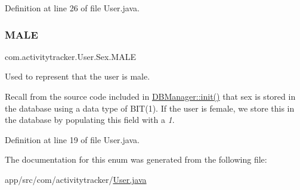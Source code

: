 Definition at line 26 of file User.\+java.

\mbox{\label{enumcom_1_1activitytracker_1_1_user_1_1_sex_ad3b626a38bd4615eb621d75b939f412d}} 
\subsubsection{\texorpdfstring{M\+A\+LE}{MALE}}
{\footnotesize\ttfamily com.\+activitytracker.\+User.\+Sex.\+M\+A\+LE}

Used to represent that the user is male.

Recall from the source code included in \mbox{\hyperlink{classcom_1_1activitytracker_1_1_d_b_manager_a41df4600bb5901a26a4ea6a7108a70b9}{D\+B\+Manager\+::init()}} that sex is stored in the database using a data type of B\+I\+T(1). If the user is female, we store this in the database by populating this field with a {\itshape 1}. 

Definition at line 19 of file User.\+java.



The documentation for this enum was generated from the following file\+:\begin{DoxyCompactItemize}
\item 
app/src/com/activitytracker/\mbox{\hyperlink{_user_8java}{User.\+java}}\end{DoxyCompactItemize}

